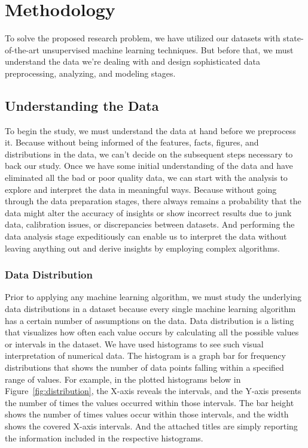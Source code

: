 \documentclass{swfuthesise}
\begin{document}
\chapter{Methodology}

To solve the proposed research problem, we have utilized our datasets with state-of-the-art unsupervised machine learning techniques. But before that, we must understand the data we're dealing with and design sophisticated data preprocessing, analyzing, and modeling stages.

\section{Understanding the Data}

To begin the study, we must understand the data at hand before we preprocess it. Because without being informed of the features, facts, figures, and distributions in the data, we can't decide on the subsequent steps necessary to back our study. Once we have some initial understanding of the data and have eliminated all the bad or poor quality data, we can start with the analysis to explore and interpret the data in meaningful ways. Because without going through the data preparation stages, there always remains a probability that the data might alter the accuracy of insights or show incorrect results due to junk data, calibration issues, or discrepancies between datasets. And performing the data analysis stage expeditiously can enable us to interpret the data without leaving anything out and derive insights by employing complex algorithms.

\subsection{Data Distribution}

Prior to applying any machine learning algorithm, we must study the underlying data distributions in a dataset because every single machine learning algorithm has a certain number of assumptions on the data. Data distribution is a listing that visualizes how often each value occurs by calculating all the possible values or intervals in the dataset. We have used histograms to see such visual interpretation of numerical data. The histogram is a graph bar for frequency distributions that shows the number of data points falling within a specified range of values. For example, in the plotted histograms below in Figure~\ref{fig:distribution}, the X-axis reveals the intervals, and the Y-axis presents the number of times the values occurred within those intervals. The bar height shows the number of times values occur within those intervals, and the width shows the covered X-axis intervals. And the attached titles are simply reporting the information included in the respective histograms.
\end{document}
